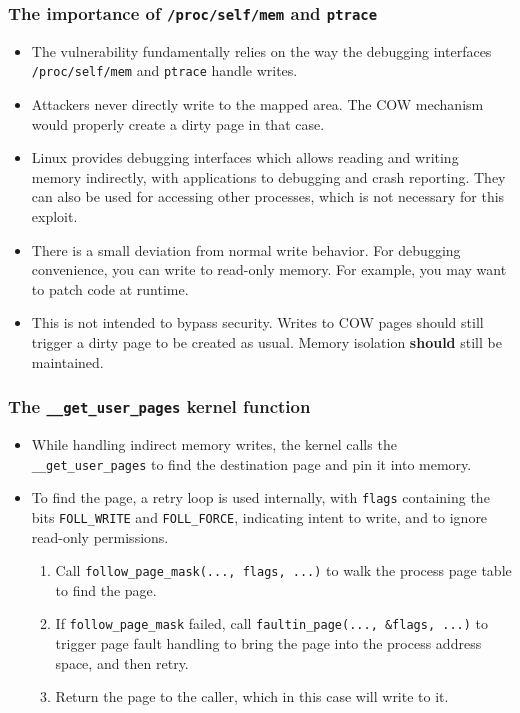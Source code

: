 \documentclass{beamer}
\newcommand{\code}[1]{\texttt{#1}}
\begin{document}
\begin{frame}
\frametitle{The importance of \code{/proc/self/mem} and \code{ptrace}}
\begin{itemize}

\item
The vulnerability fundamentally relies on the way the debugging interfaces \code{/proc/self/mem} and \code{ptrace} handle writes.

\item
Attackers never directly write to the mapped area. The COW mechanism would properly create a dirty page in that case.

\item
Linux provides debugging interfaces which allows reading and writing memory indirectly, with applications to debugging and crash reporting.
They can also be used for accessing other processes, which is not necessary for this exploit.

\item
There is a small deviation from normal write behavior.
For debugging convenience, you can write to read-only memory.
For example, you may want to patch code at runtime.

\item
This is not intended to bypass security.
Writes to COW pages should still trigger a dirty page to be created as usual.
Memory isolation \textbf{should} still be maintained.

\end{itemize}
\end{frame}

\begin{frame}
\frametitle{The \code{\_\_get\_user\_pages} kernel function}
\begin{itemize}

\item
While handling indirect memory writes, the kernel calls the \code{\_\_get\_user\_pages} to find the destination page and pin it into memory.

\item
To find the page, a retry loop is used internally, with \code{flags} containing the bits \code{FOLL\_WRITE} and \code{FOLL\_FORCE}, indicating intent to write, and to ignore read-only permissions.

\begin{enumerate}
    \item Call \code{follow\_page\_mask(..., flags, ...)} to walk the process page table to find the page.
    \item If \code{follow\_page\_mask} failed, call \code{faultin\_page(..., \&flags, ...)} to trigger page fault handling to bring the page into the process address space, and then retry.
    \item Return the page to the caller, which in this case will write to it.
\end{enumerate}

\end{itemize}
\end{frame}
\end{document}
